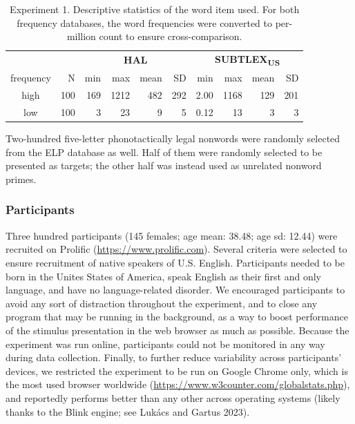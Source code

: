 \documentclass[
]{interact}
\begin{document}
\begin{longtable}{crrrrrrrrr}

\caption{\label{tbl-words_exp1}Experiment 1. Descriptive statistics of
the word item used. For both frequency databases, the word frequencies
were converted to per-million count to ensure cross-comparison.}

\tabularnewline

\toprule
 &  & \multicolumn{4}{c}{\textbf{HAL}} & \multicolumn{4}{c}{\textbf{SUBTLEX\textsubscript{US}}} \\ 
\cmidrule(lr){3-6} \cmidrule(lr){7-10}
frequency & N & min & max & mean & SD & min & max & mean & SD \\ 
\midrule\addlinespace[2.5pt]
high & 100 & 169 & 1212 & 482 & 292 & 2.00 & 1168 & 129 & 201 \\ 
low & 100 & 3 & 23 & 9 & 5 & 0.12 & 13 & 3 & 3 \\ 
\bottomrule

\end{longtable}

Two-hundred five-letter phonotactically legal nonwords were randomly
selected from the ELP database as well. Half of them were randomly
selected to be presented as targets; the other half was instead used as
unrelated nonword primes.

\subsubsection{Participants}\label{sec-exp1-methods-participants}

Three hundred participants (145 females; age mean: 38.48; age sd: 12.44)
were recruited on Prolific (\url{https://www.prolific.com}). Several
criteria were selected to ensure recruitment of native speakers of U.S.
English. Participants needed to be born in the Unites States of America,
speak English as their first and only language, and have no
language-related disorder. We encouraged participants to avoid any sort
of distraction throughout the experiment, and to close any program that
may be running in the background, as a way to boost performance of the
stimulus presentation in the web browser as much as possible. Because
the experiment was run online, participants could not be monitored in
any way during data collection. Finally, to further reduce variability
across participants' devices, we restricted the experiment to be run on
Google Chrome only, which is the most used browser worldwide
(\url{https://www.w3counter.com/globalstats.php}), and reportedly
performs better than any other across operating systems (likely thanks
to the Blink engine; see Lukács and Gartus 2023).
\end{document}
